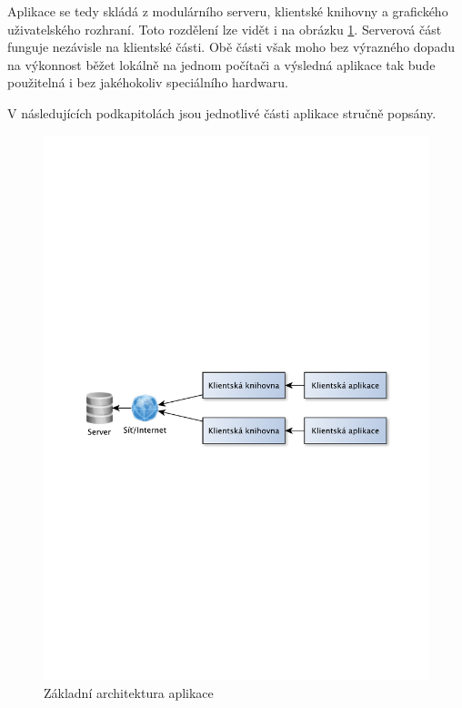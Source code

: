 Aplikace se tedy skládá z modulárního serveru, klientské knihovny a grafického uživatelského rozhraní.
Toto rozdělení lze vidět i na obrázku \ref{fig:architektura}.
Serverová část funguje nezávisle na klientské části. Obě části však moho bez výrazného dopadu 
na výkonnost běžet lokálně na jednom počítači a výsledná aplikace tak bude použitelná i bez
jakéhokoliv speciálního hardwaru.

V následujících podkapitolách jsou jednotlivé části aplikace stručně popsány.

\begin{figure}[h]
\centering
\includegraphics[trim=12cm 12cm 12cm 12cm, scale=0.8]{fig/princip}
\caption{Základní architektura aplikace} %
\label{fig:architektura}
\end{figure}

